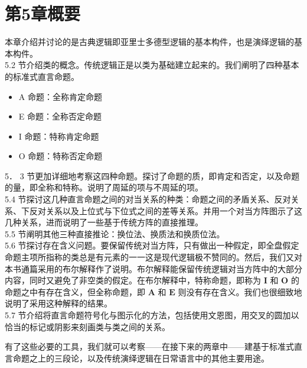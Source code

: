 \section*{第5章概要}
本章介绍并讨论的是古典逻辑即亚里士多德型逻辑的基本构件，也是演绎逻辑的基本构件。\\
5.2 节介绍类的概念。传统逻辑正是以类为基础建立起来的。我们阐明了四种基本的标准式直言命题。

\begin{itemize}
  \item A 命题：全称肯定命题
  \item E 命题：全称否定命题
  \item I 命题：特称肯定命题
  \item O 命题：特称否定命题
\end{itemize}

5． 3 节更加详细地考察这四种命题。探讨了命题的质，即肯定和否定，以及命题的量，即全称和特称。说明了周延的项与不周延的项。\\
5.4 节探讨这几种直言命题之间的对当关系的种类：命题之间的矛盾关系、反对关系、下反对关系以及上位式与下位式之间的差等关系。并用一个对当方阵图示了这几种关系，进而说明了一些基于传统方阵的直接推理。\\
5.5 节阐明其他三种直接推论：换位法、换质法和换质位法。\\
5.6 节探讨存在含义问题。要保留传统对当方阵，只有做出一种假定，即全盘假定命题主项所指称的类总是有元素的一一这是现代逻辑极不赞同的。然后，我们又对本书通篇采用的布尔解释作了说明。布尔解释能保留传统逻辑对当方阵中的大部分内容，同时又避免了非空类的假定。在布尔解释中，特称命题，即称为 $\mathbf{I}$ 和 $\mathbf{O}$ 的命题之中有存在含义，但全称命题，即 $\mathbf{A}$ 和 $\mathbf{E}$ 则没有存在含义。我们也很细致地说明了采用这种解释的结果。\\
5.7 节介绍将直言命题符号化与图示化的方法，包括使用文恩图，用交叉的圆加以恰当的标记或阴影来刻画类与类之间的关系。

有了这些必要的工具，我们就可以考察——在接下来的两章中——建基于标准式直言命题之上的三段论，以及传统演绎逻辑在日常语言中的其他主要用途。 